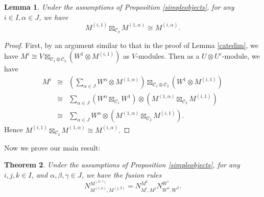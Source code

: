 \documentclass{article}
\newtheorem{lemma}{Lemma}[section]
\newtheorem{theorem}[lemma]{Theorem}
\newtheorem{proposition}[lemma]{Proposition}
\def\CC{{\mathcal{C}}}
\begin{document}
\begin{lemma}
	Under the assumptions of Proposition \ref{simpleobjects}, for any $i\in I, \alpha\in J$, we have
	\begin{equation*}
		M^{(i,1)}\boxtimes_{ \CC_2}M^{(1,\alpha)}\cong M^{(i,\alpha)}.
	\end{equation*}
\end{lemma}
\begin{proof}
	First, by an argument similar to that in the proof of Lemma \ref{catedim}, we have $M^i\cong V\boxtimes_{\CC_1\otimes \CC_2}(W^1\otimes M^{(i,1)})$ as $V$-modules. Then as a $U\otimes U^c$-module, we have
	\begin{eqnarray*}
		M^{i}
		&\cong&\left(\sum_{\alpha \in J}W^{\alpha}\otimes M^{(1,\alpha)}\right)\boxtimes_{\CC_1\otimes \CC_2}(W^1\otimes M^{(i,1)})\\
		&\cong&\sum_{\alpha \in J}\left(W^{\alpha}\boxtimes_{\CC_1} W^{1}\right)\otimes\left(M^{(1,\alpha)}\boxtimes_{\CC_2} M^{(i,1)}\right)\\
		&\cong&\sum_{\alpha \in J}W^{\alpha}\otimes\left(M^{(1,\alpha)}\boxtimes_{\CC_2} M^{(i,1)}\right).
	\end{eqnarray*}
	Hence $M^{(i,1)}\boxtimes_{ \CC_2}M^{(1,\alpha)}\cong M^{(i,\alpha)}.$
	
\end{proof}
Now we prove our main result:
\begin{theorem}\label{fusionrule1}
	Under the assumptions of Proposition \ref{simpleobjects},  for any $i, j, k \in I$, and $\alpha, \beta, \gamma \in J$, we have the fusion rules $$N_{M^{(i,\alpha)},M^{(j,\beta)}}^{M^{(k,\gamma)}}=N_{M^i,M^j}^{M^k} N_{W^{\alpha},W^{\beta}}^{W^{\gamma}}.$$
\end{theorem}
\end{document}
